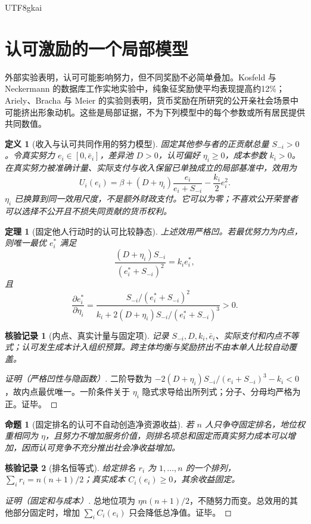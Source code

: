 \documentclass[12pt,a4paper,openany]{report}
\newtheorem{definition}{定义}[chapter]
\newtheorem{theorem}{定理}[chapter]
\newtheorem{proposition}{命题}[chapter]
\newtheorem{Certificate}{核验记录}[chapter]
\begin{document}
\begin{CJK*}{UTF8}{gkai}
\section{认可激励的一个局部模型}
外部实验表明，认可可能影响努力，但不同奖励不必简单叠加。Kosfeld 与 Neckermann 的数据库工作实地实验中，纯象征奖励使平均表现提高约12\%\cite{Kosfeld2011}；Ariely、Bracha 与 Meier 的实验则表明，货币奖励在所研究的公开亲社会场景中可能挤出形象动机\cite{Ariely2009}。这些是局部证据，不为下列模型中的每个参数或所有居民提供共同数值。

\begin{definition}[收入与认可共同作用的努力模型]
\label{def:effort}
固定其他参与者的正贡献总量 $S_{-i}>0$。令真实努力 $e_i\in[0,\bar e_i]$，差异池 $D>0$，认可偏好 $\eta_i\ge0$，成本参数 $k_i>0$。在真实努力被准确计量、实际支付与收入保留已单独成立的局部基准中，效用为
\[
 U_i(e_i)=\beta+(D+\eta_i)\frac{e_i}{e_i+S_{-i}}
 -\frac{k_i}{2}e_i^2.
\]
$\eta_i$ 已换算到同一效用尺度，不是额外财政支付。它可以为零；不喜欢公开荣誉者可以选择不公开且不损失同贡献的货币权利。
\end{definition}

\begin{theorem}[固定他人行动时的认可比较静态]
\label{thm:recognition}
上述效用严格凹。若最优努力为内点，则唯一最优 $e_i^*$ 满足
\[
 \frac{(D+\eta_i)S_{-i}}{(e_i^*+S_{-i})^2}=k_ie_i^*,
\]
且
\[
 \frac{\partial e_i^*}{\partial\eta_i}
 =\frac{S_{-i}/(e_i^*+S_{-i})^2}
 {k_i+2(D+\eta_i)S_{-i}/(e_i^*+S_{-i})^3}>0.
\]
\end{theorem}
\begin{Certificate}[内点、真实计量与固定项]
记录 $S_{-i},D,k_i,\bar e_i$、实际支付和内点不等式；认可发生成本计入组织预算。跨主体均衡与奖励挤出不由本单人比较自动覆盖。
\end{Certificate}
\begin{proof}[证明（严格凹性与隐函数）]
二阶导数为 $-2(D+\eta_i)S_{-i}/(e_i+S_{-i})^3-k_i<0$，故内点最优唯一。一阶条件关于 $\eta_i$ 隐式求导给出所列式；分子、分母均严格为正。证毕。
\end{proof}

\begin{proposition}[固定排名的认可不自动创造净资源收益]
\label{prop:status-not-welfare}
若 $n$ 人只争夺固定排名，地位权重相同为 $\eta$，且努力不增加服务价值，则排名项总和固定而真实努力成本可以增加，因而认可竞争不充分推出社会净收益增加。
\end{proposition}
\begin{Certificate}[排名恒等式]
给定排名 $r_i$ 为 $1,\ldots,n$ 的一个排列，$\sum_i r_i=n(n+1)/2$；真实成本 $C_i(e_i)\ge0$，其余收益固定。
\end{Certificate}
\begin{proof}[证明（固定和与成本）]
总地位项为 $\eta n(n+1)/2$，不随努力而变。总效用的其他部分固定时，增加 $\sum_i C_i(e_i)$ 只会降低总净值。证毕。
\end{proof}


\end{CJK*}
\end{document}
